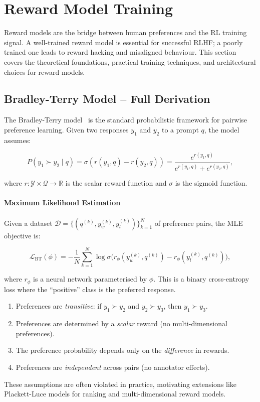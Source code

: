 \chapter{Reward Model Training}
\label{sec:reward-models}

Reward models are the bridge between human preferences and the RL training signal. A well-trained reward model is essential for successful RLHF; a poorly trained one leads to reward hacking and misaligned behaviour. This section covers the theoretical foundations, practical training techniques, and architectural choices for reward models.

\section{Bradley-Terry Model -- Full Derivation}
\label{sec:bradley-terry}

The Bradley-Terry model~\cite{bradley1952rank} is the standard probabilistic framework for pairwise preference learning. Given two responses $y_1$ and $y_2$ to a prompt $q$, the model assumes:

\[
P(y_1 \succ y_2 \mid q) = \sigma(r(y_1, q) - r(y_2, q))
    = \frac{e^{r(y_1,q)}}{e^{r(y_1,q)} + e^{r(y_2,q)}},
\]

where $r: \mathcal{Y} \times \mathcal{Q} \to \mathbb{R}$ is the scalar reward function and $\sigma$ is the sigmoid function.

\subsubsection*{Maximum Likelihood Estimation}
\label{maximum-likelihood-estimation}

Given a dataset $\mathcal{D} = \{(q^{(k)}, y_w^{(k)}, y_l^{(k)})\}_{k=1}^N$ of preference pairs, the MLE objective is:

\[
\mathcal{L}_{\text{BT}}(\phi) =
    -\frac{1}{N}\sum_{k=1}^N \log \sigma\!\bigl(r_\phi(y_w^{(k)}, q^{(k)}) - r_\phi(y_l^{(k)}, q^{(k)})\bigr),
\]

where $r_\phi$ is a neural network parameterised by $\phi$. This is a binary cross-entropy loss where the ``positive'' class is the preferred response.

\begin{keybox}
\begin{enumerate}
  \item Preferences are \emph{transitive}: if $y_1 \succ y_2$ and $y_2 \succ y_3$, then $y_1 \succ y_3$.
  \item Preferences are determined by a \emph{scalar} reward (no multi-dimensional preferences).
  \item The preference probability depends only on the \emph{difference} in rewards.
  \item Preferences are \emph{independent} across pairs (no annotator effects).
\end{enumerate}

These assumptions are often violated in practice, motivating extensions like Plackett-Luce models for ranking and multi-dimensional reward models.
\end{keybox}

